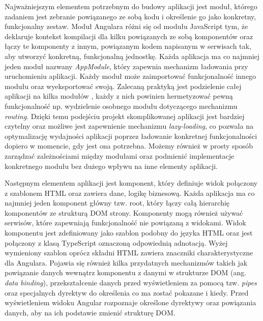 Najważniejszym elementem potrzebnym do budowy aplikacji jest moduł, którego zadaniem jest zebranie powiązanego ze sobą kodu i określenie go jako konkretny, funkcjonalny zestaw. Moduł Angulara różni się od modułu JavaScript tym, że deklaruje kontekst kompilacji dla kilku powiązanych ze sobą komponentów oraz łączy te komponenty z innym, powiązanym kodem napisanym w serwisach tak, aby utworzyć konkretną, funkcjonalną jednostkę. Każda aplikacja ma co najmniej jeden moduł nazwany \mbox{\textit{AppModule}}, który zapewnia mechanizm ładowania przy uruchomieniu aplikacji. Każdy moduł może zaimportować funkcjonalność innego modułu oraz wyeksportować swoją. Zalecaną praktyką jest podzielenie całej aplikacji na kilka modułów \cite{ANG02}, każdy z nich powinien hermetyzować pewną funkcjonalność np. wydzielenie osobnego modułu dotyczącego mechanizmu \textit{routing}. Dzięki temu podejściu projekt skomplikowanej aplikacji jest bardziej czytelny oraz możliwe jest zapewnienie mechanizmu \textit{lazy-loading}, co pozwala na optymalizację wydajności aplikacji poprzez ładowanie konkretnej funkcjonalności dopiero w momencie, gdy jest ona potrzebna. Możemy również w prosty sposób zarządzać zależnościami między modułami oraz podmienić implementacje konkretnego modułu bez dużego wpływu na inne elementy aplikacji.


Następnym elementem aplikacji jest komponent, który definiuje widok połączony z szablonem HTML oraz zawiera dane, logikę biznesową. Każda aplikacja ma co najmniej jeden komponent główny tzw. root, który łączy całą hierarchię komponentów ze strukturą DOM strony. Komponenty mogą również używać serwisów, które zapewniają funkcjonalność nie powiązaną z widokami. Widok komponentu jest zdefiniowany jako szablon podobny do języka HTML oraz jest połączony z klasą TypeScript oznaczoną odpowiednią adnotacją\cite{ANG02}. Wyżej wymieniony szablon oprócz składni HTML zawiera znaczniki charakterystyczne dla Angulara. Pojawia się również kilka przydatnych mechanizmów takich jak powiązanie danych wewnątrz komponentu z danymi w strukturze DOM (ang. \textit{data binding}), przekształcenie danych przed wyświetleniem za pomocą tzw. \textit{pipes} oraz specjalnych dyrektyw do określenia co ma zostać pokazane i kiedy. Przed wyświetleniem widoku Angular rozpoznaje określone dyrektywy oraz powiązania danych, aby na ich podstawie zmienić strukturę DOM.

